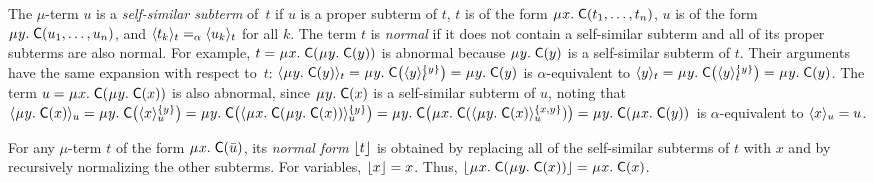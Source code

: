 The $\mu$-term $u$
is a \emph{self-similar subterm} of~$t$ if
$u$ is a proper subterm of $t$,
$t$ is of the form $\MU x.\; \const{C}( t_1, \ldots, t_n )$,
$u$ is of the form $\MU y.\; \const{C}( u_1, \ldots, u_n )$,
and $\expand{t}{ t_k } \aequiv \expand{t}{ u_k }$ for all $k$. %
The term $t$ is \emph{normal} if it does not contain a self-similar subterm
and all of its proper subterms are also normal.
For example, $t = \MU x.\; \const{C}( \MU y.\; \const{C}( y ) )$ is abnormal
because $\MU y.\; \const{C}( y )$ is a self-similar subterm of $t$.
Their arguments have the same expansion with respect to~$t$:
$\expand{t}{\MU y.\; \const{C}( y )} =
\MU y.\; \const{C}\bigl( \expand{t}{y}^{\smash{\{y\}}} \bigr) =
\MU y.\; \const{C}( y )$
is $\alpha$-equivalent to
$\expand{t}{y} =
\MU y.\; \const{C}\bigl( \expand{t}{y}^{\smash{\{y\}}} \bigr) =
\MU y.\; \const{C}( y )$.
The term $u = \MU x.\; \const{C}( \MU y.\; \const{C}( x ) )$ is also abnormal,
since $\MU y.\; \const{C}( x )$ is a self-similar subterm of $u$,
noting that
%
$\expand{u}{\MU y.\; \const{C}( x )}
 = \MU y.\; \const{C}\bigl( \expand{u}{x}^{\smash{\{y\}}} \bigr)
 = \MU y.\; \const{C}\bigl( \expand{u}{\MU x.\; \const{C}( \MU y.\; \const{C}( x ) ) }^{\smash{\{y\}}} \bigr)
 = \MU y.\; \const{C}\bigl( \MU x.\; \const{C}( \expand{u}{\MU y.\; \const{C}( x )}^{\smash{\{x,y\}}} ) \bigr)
 = \MU y.\allowbreak\; \const{C}( \MU x.\allowbreak\; \const{C}( y ) )$
is $\alpha$-equivalent to $\expand{u}{x} = u$.

For any $\mu$-term $t$ of the form $\MU x.\; \const C( \vec u )$,
its \emph{normal form} $\nf{t}$ is obtained
by replacing all of the self-similar subterms of $t$ with $x$
and by recursively normalizing the other subterms.
For variables, $\nf{x} = x$.
Thus, $\nf{\MU x.\; \const{C}( \MU y.\; \const{C}( x ) )} = \MU x.\; \const{C}( x )$.

